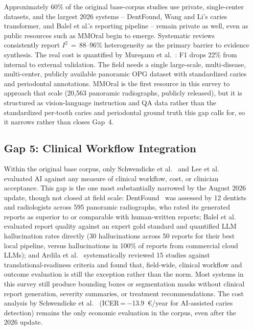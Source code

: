 \documentclass[conference]{IEEEtran}
\begin{document}
Approximately 60\% of the original base-corpus studies use private,
single-center datasets, and the largest 2026 systems -- DentFound,
Wang and Li's caries transformer, and Balel et al.'s reporting pipeline
\cite{zhu2026dentfound,wang2026transformer,balel2026hybrid} -- remain
private as well, even as public resources such as MMOral
\cite{hao2025mmoral} begin to emerge. Systematic reviews
\cite{iacob2025automated,albano2024artificial,luke2025accuracy,bonfanti2025deep,khubrani2025detection}
consistently report $I^2\,=\,88$--$96\%$ heterogeneity as the primary
barrier to evidence synthesis. The real cost is quantified by
Mure\c{s}anu et al.~\cite{muresanu2024automating}: F1 drops 22\% from
internal to external validation. The field needs a single large-scale,
multi-disease, multi-center, publicly available panoramic OPG dataset
with standardized caries and periodontal annotations. MMOral
\cite{hao2025mmoral} is the first resource in this survey to approach
that scale (20,563 panoramic radiographs, publicly released), but it
is structured as vision-language instruction and QA data rather than
the standardized per-tooth caries and periodontal ground truth this
gap calls for, so it narrows rather than closes Gap~4.

\subsection{Gap 5: Clinical Workflow Integration}

Within the original base corpus, only Schwendicke et
al.~\cite{schwendicke2021cost} and Lee et
al.~\cite{lee2025evaluation} evaluated AI against any measure of
clinical workflow, cost, or clinician acceptance. This gap is the one
most substantially narrowed by the August 2026 update, though not
closed at field scale: DentFound~\cite{zhu2026dentfound} was assessed
by 12 dentists and radiologists across 595 panoramic radiographs, who
rated its generated reports as superior to or comparable with
human-written reports; Balel et al.~\cite{balel2026hybrid} evaluated
report quality against an expert gold standard and quantified LLM
hallucination rates directly (30 hallucinations across 50 reports for
their best local pipeline, versus hallucinations in 100\% of reports
from commercial cloud LLMs); and Ardila et
al.~\cite{ardila2026algorithmic} systematically reviewed 15 studies
against translational-readiness criteria and found that, field-wide,
clinical workflow and outcome evaluation is still the exception rather
than the norm. Most systems in this survey still produce bounding
boxes or segmentation masks without clinical report generation,
severity summaries, or treatment recommendations. The cost analysis by
Schwendicke et al.~\cite{schwendicke2021cost} (ICER\,=\,$-$13.9~\euro/year
for AI-assisted caries detection) remains the only economic evaluation
in the corpus, even after the 2026 update.
\end{document}
